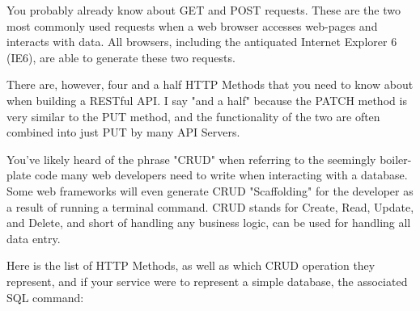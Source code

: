 \documentclass{book}
\begin{document}
You probably already know about GET and POST requests. These are the two most commonly used requests when a web browser accesses web-pages and interacts with data. All browsers, including the antiquated Internet Explorer 6 (IE6), are able to generate these two requests.

There are, however, four and a half HTTP Methods that you need to know about when building a RESTful API. I say "and a half" because the PATCH method is very similar to the PUT method, and the functionality of the two are often combined into just PUT by many API Servers.

You've likely heard of the phrase "CRUD" when referring to the seemingly boiler-plate code many web developers need to write when interacting with a database. Some web frameworks will even generate CRUD "Scaffolding" for the developer as a result of running a terminal command. CRUD stands for Create, Read, Update, and Delete, and short of handling any business logic, can be used for handling all data entry.

Here is the list of HTTP Methods, as well as which CRUD operation they represent, and if your service were to represent a simple database, the associated SQL command:
\end{document}
